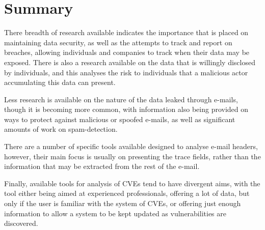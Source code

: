 \section{Summary}

There breadth of research available indicates the importance that is placed on
maintaining data security, as well as the attempts to track and report on
breaches, allowing individuals and companies to track when their data may be
exposed.  There is also a research available on the data that is willingly
disclosed by individuals, and this analyses the risk to individuals that a
malicious actor accumulating this data can present. 

Less research is available on the nature of the data leaked through e-mails,
though it is becoming more common, with information also being provided on ways
to protect against malicious or spoofed e-mails, as well as significant amounts
of work on spam-detection.

There are a number of specific tools available designed to analyse e-mail
headers, however, their main focus is usually on presenting the trace fields,
rather than the information that may be extracted from the rest of the e-mail.

Finally, available tools for analysis of CVEs tend to have divergent aims, with
the tool either being aimed at experienced professionals, offering a lot of
data, but only if the user is familiar with the system of CVEs, or offering
just enough information to allow a system to be kept updated as vulnerabilities
are discovered.
